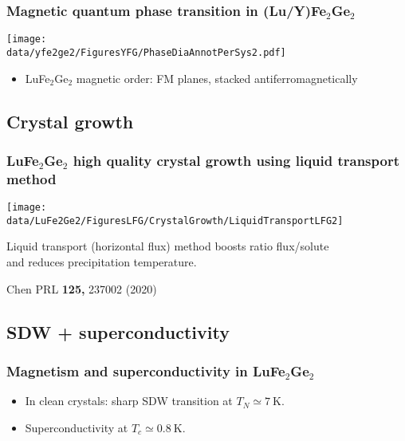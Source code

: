 \begin{frame}[label=YFGIntro2b]

\frametitle{Magnetic quantum phase transition in (Lu/Y)Fe$_2$Ge$_2$}
\centerline{\texttt{[image: \\data/yfe2ge2/FiguresYFG/PhaseDiaAnnotPerSys2.pdf]}}
\begin{itemize}
\item 
LuFe$_2$Ge$_2$ magnetic order: FM planes, stacked antiferromagnetically
%
\end{itemize}
\end{frame}

\subsection{Crystal growth}
\begin{frame}[label=LFGGrowth]
\frametitle{LuFe$_2$Ge$_2$ high quality crystal growth using liquid transport method}
\centerline{\texttt{[image: \\data/LuFe2Ge2/FiguresLFG/CrystalGrowth/LiquidTransportLFG2]}}

\begin{center}
Liquid transport (horizontal flux) method boosts ratio flux/solute \\
and reduces precipitation temperature.
\end{center}
\vspace*{\fill}
\centerline{\makebox[\linewidth]{\rule{0.85\textwidth}{0.4pt}}}
\centerline{\scriptsize Chen PRL {\bf 125,} 237002 (2020)}
\end{frame}



\subsection{SDW + superconductivity}
\begin{frame}[label=LFGAnomalies]
\frametitle{Magnetism and superconductivity in LuFe$_2$Ge$_2$}
\centerline{}

\begin{itemize}
\item <1-> In clean crystals: sharp SDW transition at $T_N \simeq \SI{7}{\kelvin}$.
\item <2-> Superconductivity at $T_c \simeq \SI{0.8}{\kelvin}$.
\end{itemize}
\end{frame}

